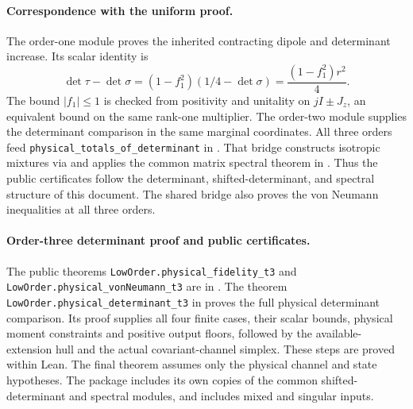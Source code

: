 \documentclass[11pt,a4paper]{article}
\begin{document}
\paragraph{Correspondence with the uniform proof.}
The order-one module  proves the inherited
contracting dipole and determinant increase. Its scalar identity is
\[
 \det\tau-\det\sigma=(1-f_1^2)(1/4-\det\sigma)
 =\frac{(1-f_1^2)r^2}{4}.
\]
The bound $|f_1|\le1$ is checked from positivity and unitality on
$jI\pm J_z$, an equivalent bound on the same rank-one multiplier.
The order-two module  supplies
the determinant comparison in the same marginal coordinates.
All three orders feed \texttt{physical\_totals\_of\_determinant} in
. That bridge constructs isotropic
mixtures via  and applies the common
matrix spectral theorem in .
Thus the public certificates follow the determinant,
shifted-determinant, and spectral structure of this document. The shared
bridge also proves the von Neumann inequalities at all three orders.

\paragraph{Order-three determinant proof and public certificates.}
The public theorems
\texttt{LowOrder.physical\_fidelity\_t3} and
\texttt{LowOrder.physical\_vonNeumann\_t3} are in
.
The theorem \texttt{LowOrder.physical\_determinant\_t3} in
 proves the full physical
determinant comparison. Its proof supplies all four finite cases,
their scalar bounds, physical moment constraints and positive output
floors, followed by the available-extension hull and the actual
covariant-channel simplex. These steps are proved within Lean.
The final theorem assumes only the physical channel and state hypotheses.
The package includes its own copies of the common shifted-determinant
and spectral modules, and includes mixed and singular inputs.
\end{document}
